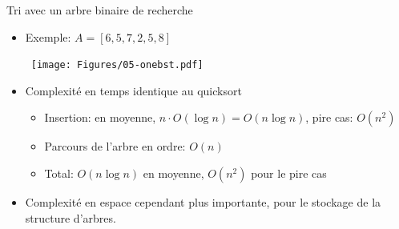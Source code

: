 \begin{frame}{Tri avec un arbre binaire de recherche}

\begin{center}
\begin{small}
\end{small}
\end{center}

\begin{itemize}
\item Exemple: $A=[6,5,7,2,5,8]$

~\hfill\texttt{[image: Figures/05-onebst.pdf]}
\item Complexité en temps identique au quicksort
\begin{itemize}
\item Insertion: en moyenne, $n\cdot O(\log n)=O(n\log n)$, pire cas: $O(n^2)$
\item Parcours de l'arbre en ordre: $O(n)$
\item Total: $O(n\log n)$ en moyenne, $O(n^2)$ pour le pire cas
\end{itemize}
\item Complexité en espace cependant plus importante, pour le stockage de la structure d'arbres.
\end{itemize}


\end{frame}

